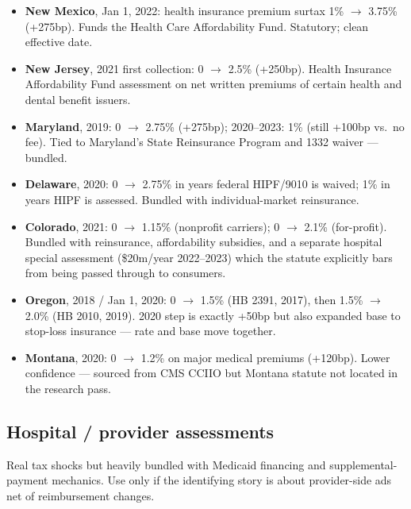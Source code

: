 \begin{itemize}
  \item \textbf{New Mexico}, Jan 1, 2022: health insurance
        premium surtax 1\% $\to$ 3.75\% (+275bp). Funds the
        Health Care Affordability Fund. Statutory; clean
        effective date.
  \item \textbf{New Jersey}, 2021 first collection: 0 $\to$
        2.5\% (+250bp). Health Insurance Affordability Fund
        assessment on net written premiums of certain health
        and dental benefit issuers.
  \item \textbf{Maryland}, 2019: 0 $\to$ 2.75\% (+275bp);
        2020--2023: 1\% (still +100bp vs.\ no fee). Tied to
        Maryland's State Reinsurance Program and 1332
        waiver --- bundled.
  \item \textbf{Delaware}, 2020: 0 $\to$ 2.75\% in years
        federal HIPF/9010 is waived; 1\% in years HIPF is
        assessed. Bundled with individual-market reinsurance.
  \item \textbf{Colorado}, 2021: 0 $\to$ 1.15\% (nonprofit
        carriers); 0 $\to$ 2.1\% (for-profit). Bundled with
        reinsurance, affordability subsidies, and a separate
        hospital special assessment (\$20m/year 2022--2023)
        which the statute explicitly bars from being passed
        through to consumers.
  \item \textbf{Oregon}, 2018 / Jan 1, 2020: 0 $\to$ 1.5\%
        (HB 2391, 2017), then 1.5\% $\to$ 2.0\% (HB 2010,
        2019). 2020 step is exactly +50bp but also expanded
        base to stop-loss insurance --- rate and base move
        together.
  \item \textbf{Montana}, 2020: 0 $\to$ 1.2\% on major
        medical premiums (+120bp). Lower confidence ---
        sourced from CMS CCIIO but Montana statute not
        located in the research pass.
\end{itemize}

\subsection*{Hospital / provider assessments}

Real tax shocks but heavily bundled with Medicaid financing
and supplemental-payment mechanics. Use only if the
identifying story is about provider-side ads net of
reimbursement changes.

